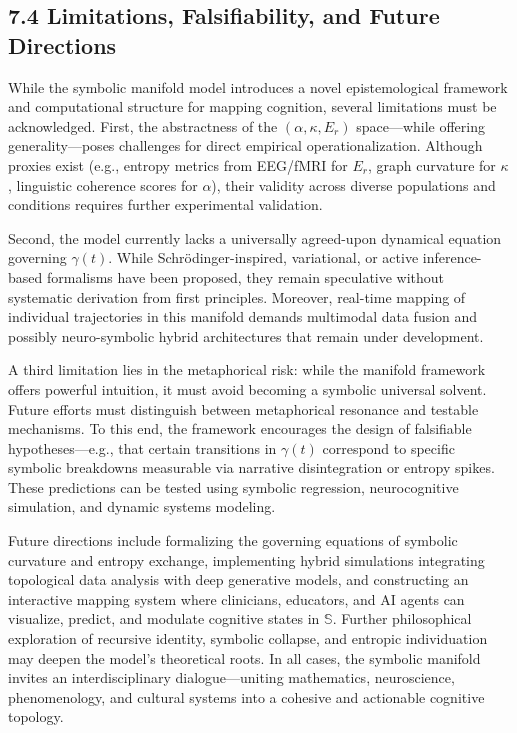 \subsection*{7.4 Limitations, Falsifiability, and Future Directions}

While the symbolic manifold model introduces a novel epistemological framework and computational structure for mapping cognition, several limitations must be acknowledged. First, the abstractness of the $(\alpha, \kappa, E_r)$ space—while offering generality—poses challenges for direct empirical operationalization. Although proxies exist (e.g., entropy metrics from EEG/fMRI for $E_r$, graph curvature for $\kappa$, linguistic coherence scores for $\alpha$), their validity across diverse populations and conditions requires further experimental validation. 

Second, the model currently lacks a universally agreed-upon dynamical equation governing $\gamma(t)$. While Schrödinger-inspired, variational, or active inference-based formalisms have been proposed, they remain speculative without systematic derivation from first principles. Moreover, real-time mapping of individual trajectories in this manifold demands multimodal data fusion and possibly neuro-symbolic hybrid architectures that remain under development.

A third limitation lies in the metaphorical risk: while the manifold framework offers powerful intuition, it must avoid becoming a symbolic universal solvent. Future efforts must distinguish between metaphorical resonance and testable mechanisms. To this end, the framework encourages the design of falsifiable hypotheses—e.g., that certain transitions in $\gamma(t)$ correspond to specific symbolic breakdowns measurable via narrative disintegration or entropy spikes. These predictions can be tested using symbolic regression, neurocognitive simulation, and dynamic systems modeling.

Future directions include formalizing the governing equations of symbolic curvature and entropy exchange, implementing hybrid simulations integrating topological data analysis with deep generative models, and constructing an interactive mapping system where clinicians, educators, and AI agents can visualize, predict, and modulate cognitive states in $\mathbb{S}$. Further philosophical exploration of recursive identity, symbolic collapse, and entropic individuation may deepen the model’s theoretical roots. In all cases, the symbolic manifold invites an interdisciplinary dialogue—uniting mathematics, neuroscience, phenomenology, and cultural systems into a cohesive and actionable cognitive topology.


